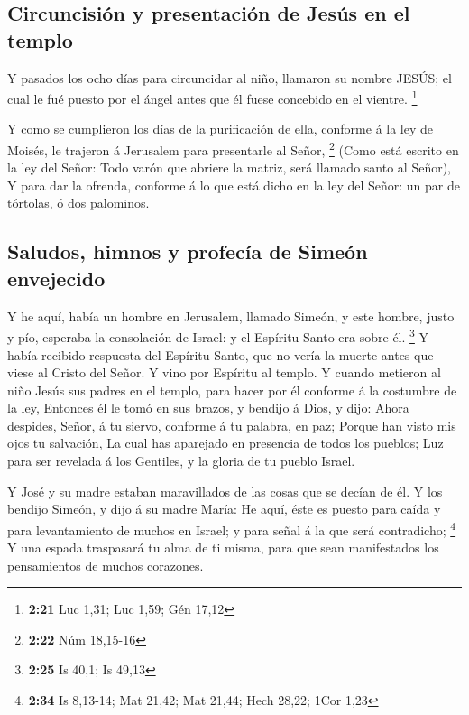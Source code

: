 \hypertarget{circuncisiuxf3n-y-presentaciuxf3n-de-jesuxfas-en-el-templo}{%
\subsection{Circuncisión y presentación de Jesús en el
templo}\label{circuncisiuxf3n-y-presentaciuxf3n-de-jesuxfas-en-el-templo}}

 Y pasados los ocho días para circuncidar al niño, llamaron
su nombre JESÚS; el cual le fué puesto por el ángel antes que él fuese
concebido en el vientre. \footnote{\textbf{2:21} Luc 1,31; Luc 1,59; Gén
  17,12}

 Y como se cumplieron los días de la purificación de ella,
conforme á la ley de Moisés, le trajeron á Jerusalem para presentarle al
Señor, \footnote{\textbf{2:22} Núm 18,15-16}  (Como está
escrito en la ley del Señor: Todo varón que abriere la matriz, será
llamado santo al Señor),  Y para dar la ofrenda, conforme á
lo que está dicho en la ley del Señor: un par de tórtolas, ó dos
palominos.

\hypertarget{saludos-himnos-y-profecuxeda-de-simeuxf3n-envejecido}{%
\subsection{Saludos, himnos y profecía de Simeón
envejecido}\label{saludos-himnos-y-profecuxeda-de-simeuxf3n-envejecido}}

 Y he aquí, había un hombre en Jerusalem, llamado Simeón, y
este hombre, justo y pío, esperaba la consolación de Israel: y el
Espíritu Santo era sobre él. \footnote{\textbf{2:25} Is 40,1; Is 49,13}
 Y había recibido respuesta del Espíritu Santo, que no
vería la muerte antes que viese al Cristo del Señor.  Y
vino por Espíritu al templo. Y cuando metieron al niño Jesús sus padres
en el templo, para hacer por él conforme á la costumbre de la ley,
 Entonces él le tomó en sus brazos, y bendijo á Dios, y
dijo:  Ahora despides, Señor, á tu siervo, conforme á tu
palabra, en paz;  Porque han visto mis ojos tu salvación,
 La cual has aparejado en presencia de todos los pueblos;
 Luz para ser revelada á los Gentiles, y la gloria de tu
pueblo Israel.

 Y José y su madre estaban maravillados de las cosas que se
decían de él.  Y los bendijo Simeón, y dijo á su madre
María: He aquí, éste es puesto para caída y para levantamiento de muchos
en Israel; y para señal á la que será contradicho; \footnote{\textbf{2:34}
  Is 8,13-14; Mat 21,42; Mat 21,44; Hech 28,22; 1Cor 1,23} 
Y una espada traspasará tu alma de ti misma, para que sean manifestados
los pensamientos de muchos corazones.

